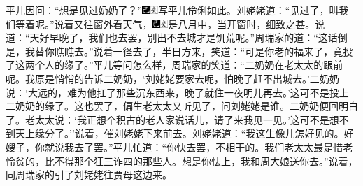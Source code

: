 平儿因问：``想是见过奶奶了？''{\includegraphics[width=3mm]{../Images/00003}\includegraphics[width=3mm]{../Images/00012}\footnotesize \kaishu 写平儿伶俐如此。}刘姥姥道：``见过了，叫我们等着呢。''说着又往窗外看天气，{\includegraphics[width=3mm]{../Images/00003}\includegraphics[width=3mm]{../Images/00012}\footnotesize \kaishu 是八月中，当开窗时，细致之甚。}说道：``天好早晚了，我们也去罢，别出不去城才是饥荒呢。''周瑞家的道：``这话倒是，我替你瞧瞧去。''说着一径去了，半日方来，笑道：``可是你老的福来了，竟投了这两个人的缘了。''平儿等问怎么样，周瑞家的笑道：``二奶奶在老太太的跟前呢。我原是悄悄的告诉二奶奶，`刘姥姥要家去呢，怕晚了赶不出城去。'二奶奶说：`大远的，难为他扛了那些沉东西来，晚了就住一夜明儿再去。'这可不是投上二奶奶的缘了。这也罢了，偏生老太太又听见了，问刘姥姥是谁。二奶奶便回明白了。老太太说：`我正想个积古的老人家说话儿，请了来我见一见。'这可不是想不到天上缘分了。''说着，催刘姥姥下来前去。刘姥姥道：``我这生像儿怎好见的。好嫂子，你就说我去了罢。''平儿忙道：``你快去罢，不相干的。我们老太太最是惜老怜贫的，比不得那个狂三诈四的那些人。想是你怯上，我和周大娘送你去。''说着，同周瑞家的引了刘姥姥往贾母这边来。

